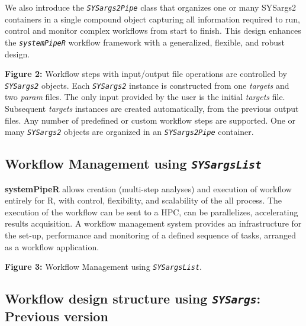 \documentclass[14pt,]{article}
\begin{document}
We also introduce the \emph{\texttt{SYSargs2Pipe}} class that organizes one or many
SYSargs2 containers in a single compound object capturing all information
required to run, control and monitor complex workflows from start to finish. This
design enhances the \emph{\texttt{systemPipeR}} workflow framework with a generalized,
flexible, and robust design.

\textbf{Figure 2:} Workflow steps with input/output file operations are controlled by
\emph{\texttt{SYSargs2}} objects. Each \emph{\texttt{SYSargs2}} instance is constructed from one \emph{targets}
and two \emph{param} files. The only input provided by the user is the initial \emph{targets}
file. Subsequent \emph{targets} instances are created automatically, from the previous
output files. Any number of predefined or custom workflow steps are supported. One
or many \emph{\texttt{SYSargs2}} objects are organized in an \emph{\texttt{SYSargs2Pipe}} container.

\hypertarget{workflow-management-using-sysargslist}{%
\subsection{\texorpdfstring{Workflow Management using \emph{\texttt{SYSargsList}}}{Workflow Management using SYSargsList}}\label{workflow-management-using-sysargslist}}

\textbf{systemPipeR} allows creation (multi-step analyses) and execution of workflow entirely for R, with control, flexibility, and scalability of the all process. The execution of the workflow can be sent to a HPC, can be parallelizes, accelerating results acquisition. A workflow management system provides an infrastructure for the set-up, performance and monitoring of a defined sequence of tasks, arranged as a workflow application.

\textbf{Figure 3:} Workflow Management using \emph{\texttt{SYSargsList}}.

\hypertarget{workflow-design-structure-using-sysargs-previous-version}{%
\subsection{\texorpdfstring{Workflow design structure using \emph{\texttt{SYSargs}}: Previous version}{Workflow design structure using SYSargs: Previous version}}\label{workflow-design-structure-using-sysargs-previous-version}}
\end{document}
